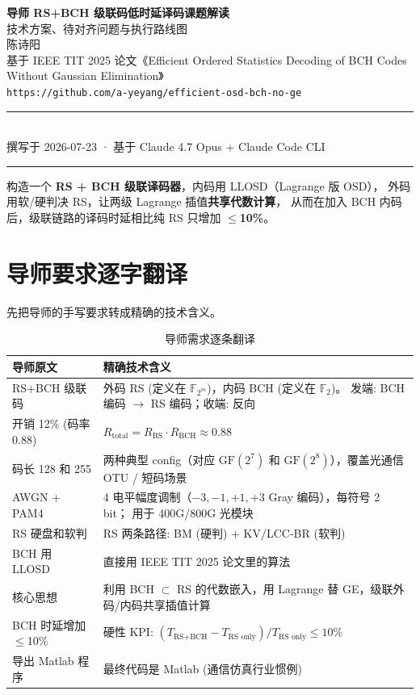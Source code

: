 \documentclass[11pt,a4paper]{article}
\begin{document}
\begin{center}
{\Large\bfseries 导师 RS+BCH 级联码低时延译码课题解读}\\[4pt]
{\large 技术方案、待对齐问题与执行路线图}\\[16pt]
{\normalsize 陈诗阳\\
基于 IEEE TIT 2025 论文《Efficient Ordered Statistics Decoding of BCH Codes Without Gaussian Elimination》\\
\vspace{2pt}
\texttt{https://github.com/a-yeyang/efficient-osd-bch-no-ge}}\\[10pt]
\rule{0.9\textwidth}{0.4pt}\\[6pt]
{\footnotesize 撰写于 2026-07-23 · 基于 Claude 4.7 Opus + Claude Code CLI}\\
\rule{0.9\textwidth}{0.4pt}
\end{center}

\vspace{6pt}
\begin{keybox}[title=\textbf{一句话总结导师要做的事}]
构造一个 \textbf{RS + BCH 级联译码器}，内码用 LLOSD（Lagrange 版 OSD），
外码用软/硬判决 RS，让两级 Lagrange 插值\textbf{共享代数计算}，
从而在加入 BCH 内码后，级联链路的译码时延相比纯 RS 只增加
\textbf{$\leq$10\%}。
\end{keybox}

\section{导师要求逐字翻译}

先把导师的手写要求转成精确的技术含义。

\begin{table}[h!]
\centering
\begin{tabularx}{\textwidth}{lX}
\toprule
\textbf{导师原文} & \textbf{精确技术含义} \\
\midrule
RS+BCH 级联码 &
外码 RS (定义在 $\mathbb{F}_{2^m}$)，内码 BCH (定义在 $\mathbb{F}_2$)。
发端: BCH 编码 $\to$ RS 编码；收端: 反向 \\
开销 12\% (码率 0.88) &
$R_{\text{total}} = R_{\text{RS}} \cdot R_{\text{BCH}} \approx 0.88$ \\
码长 128 和 255 &
两种典型 config（对应 $\text{GF}(2^7)$ 和 $\text{GF}(2^8)$），覆盖光通信 OTU / 短码场景 \\
AWGN + PAM4 &
4 电平幅度调制（$-3, -1, +1, +3$ Gray 编码），每符号 2 bit；
用于 400G/800G 光模块 \\
RS 硬盘和软判 & RS 两条路径: BM (硬判) + KV/LCC-BR (软判) \\
BCH 用 LLOSD & 直接用 IEEE TIT 2025 论文里的算法 \\
核心思想 &
利用 BCH $\subset$ RS 的代数嵌入，用 Lagrange 替 GE，级联外码/内码共享插值计算 \\
BCH 时延增加 $\leq$10\% &
硬性 KPI: $(T_{\text{RS+BCH}} - T_{\text{RS only}}) / T_{\text{RS only}} \leq 10\%$ \\
导出 Matlab 程序 & 最终代码是 Matlab (通信仿真行业惯例) \\
\bottomrule
\end{tabularx}
\caption{导师需求逐条翻译}
\end{table}
\end{document}
